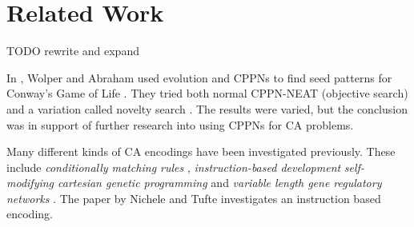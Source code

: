\chapter{Related Work}
TODO rewrite and expand

In \cite{wolper-2015}, Wolper and Abraham used evolution and CPPNs to find seed patterns for Conway's Game of Life \cite{berlekamp1982winning}.
They tried both normal CPPN-NEAT (objective search) and a variation called novelty search \cite{lehman-2008}.
The results were varied, but the conclusion was in support of further research into using CPPNs for CA problems.

Many different kinds of CA encodings have been investigated previously.
These include \textit{conditionally matching rules} \cite{bidlo2013evolution, bidlo2015investigation, bidlo2015routine},
\textit{instruction-based development} \cite{bidlo2008instruction, bidlo2012evolution, nichele2016genotype,nichele2014evolutionary,nichele2016evolutionary}
\textit{self-modifying cartesian genetic programming} \cite{harding2011self}
and \textit{variable length gene regulatory networks} \cite{trefzer2013advantages}.
The paper \cite{nichele2014evolutionary} by Nichele and Tufte investigates an instruction based encoding.

